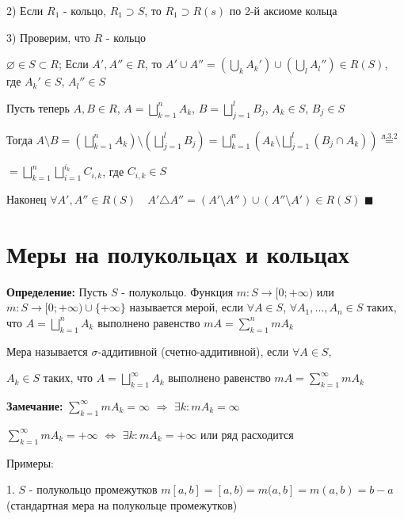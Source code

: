 \documentclass[a4paper]{report}
\begin{document}
2) Если $R_1$ - кольцо, $R_1\supset S$, то $R_1\supset R(s)$ по 2-й аксиоме кольца

3) Проверим, что $R$ - кольцо

$\varnothing\in S\subset R$; Если $A',A''\in R$, то $A'\cup A''=\left(\bigcup\limits_k A_k'\right)\cup\left(\bigcup\limits_l
A_l''\right)\in R(S)$, где $A_k'\in S$, $A_l''\in S$

Пусть теперь $A,B\in R$, $A=\bigsqcup\limits_{k=1}^n A_k$, $B=\bigsqcup\limits_{j=1}^l B_j$, $A_k\in S$, $B_j\in S$

Тогда $A\setminus B=\left(\bigsqcup\limits_{k=1}^n A_k\right)\setminus\left(\bigsqcup\limits_{j=1}^l B_j\right)=
\bigsqcup\limits_{k=1}^n\left(A_k\setminus\bigsqcup\limits_{j=1}^l(B_j\cap A_k)\right)\stackrel{\text{л.3.2}}{=}$

\noindent$=\bigsqcup\limits_{k=1}^n\bigsqcup\limits_{i=1}^{i_k}C_{i,k}$, где $C_{i,k}\in S$

Наконец $\forall A',A''\in R(S)\quad A'\triangle A''=(A'\setminus A'')\cup(A''\setminus A')\in R(S)$ $\blacksquare$







\chapter{Меры на полукольцах и кольцах}

\noindent\textbf{Определение:} Пусть $S$ - полукольцо. Функция $m\colon S\to[0;+\infty)$ или $m\colon S\to[0;+\infty)\cup
\{+\infty\}$ называется мерой, если $\forall A\in S$, $\forall A_1,\ldots,A_n\in S$ таких, что $A=\bigsqcup\limits_{k=1}^n
A_k$ выполнено равенство $mA=\sum\limits_{k=1}^n mA_k$

Мера называется $\sigma$-аддитивной (счетно-аддитивной), если $\forall A\in S$,

\noindent $A_k\in S$ таких, что $A=\bigsqcup\limits_{k=1}^\infty A_k$ выполнено равенство $mA=\sum\limits_{k=1}^\infty mA_k$
\bigskip

\noindent\textbf{Замечание:} $\sum\limits_{k=1}^\infty mA_k=\infty$ $\Rightarrow$ $\exists k\colon mA_k=\infty$

$\sum\limits_{k=1}^\infty mA_k=+\infty$ $\Leftrightarrow$ $\exists k\colon mA_k=+\infty$ или ряд расходится
\bigskip

\noindent Примеры:

1. $S$ - полукольцо промежутков $m[a,b]=[a,b)=m(a,b]=m(a,b)=b-a$ (стандартная мера на полукольце промежутков)
\end{document}
